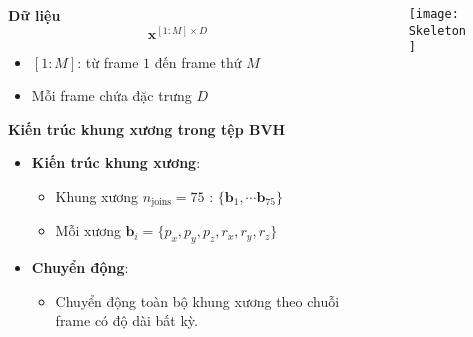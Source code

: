 \begin{frame}
	\begin{columns}
		\begin{column}{0.6\textwidth}
			\textbf{Dữ liệu}
			{\Large
			\begin{equation*}
				\mathbf{x}^{[1:M] \times D}
			\end{equation*}
		}
		
			\begin{itemize}
				\item $[1:M]$: từ frame $1$ đến frame thứ $M$
				\item Mỗi frame chứa đặc trưng $D$
			\end{itemize}
			
			
			\textbf{Kiến trúc khung xương trong tệp BVH}
			
			\begin{itemize}
				\item \textbf{Kiến trúc khung xương}:
				\begin{itemize}
					\item Khung xương $n_{\text{joins}} = 75$ : $\{ \mathbf{b}_1, \cdots \mathbf{b}_{75} \}$
					\item Mỗi xương $\mathbf{b}_{i} = \{p_x, p_y, p_z, r_x, r_y, r_z\}$
					
				\end{itemize}
				\item \textbf{Chuyển động}:
				\begin{itemize}
					\item Chuyển động toàn bộ khung xương theo chuỗi frame có độ dài bất kỳ.
				\end{itemize}
			\end{itemize}
			
			
		
		\end{column}
		
			\begin{column}{0.4\textwidth}
				\begin{figure}[h]
					\centering
					\texttt{[image: Skeleton]}
				\end{figure}
		\end{column}
		
	\end{columns}
	
\end{frame}



